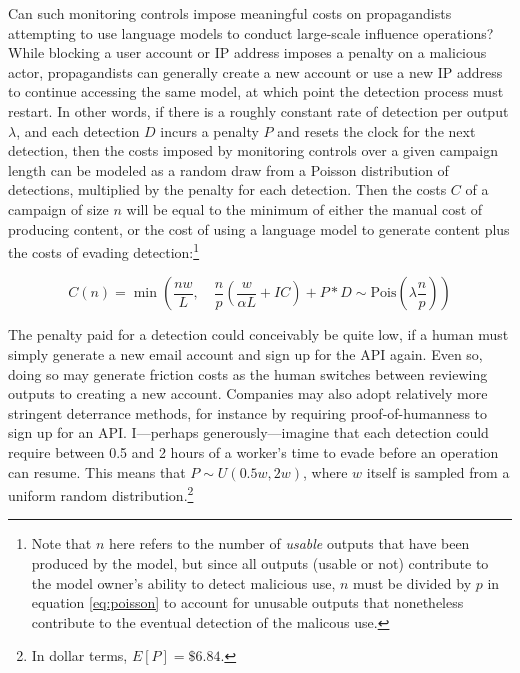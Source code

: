 \documentclass{article}
\begin{document}
Can such monitoring controls impose meaningful costs on propagandists attempting to use language models to conduct large-scale influence operations? While blocking a user account or IP address imposes a penalty on a malicious actor, propagandists can generally create a new account or use a new IP address to continue accessing the same model, at which point the detection process must restart. In other words, if there is a roughly constant rate of detection per output $\lambda$, and each detection $D$ incurs a penalty $P$ and resets the clock for the next detection, then the costs imposed by monitoring controls over a given campaign length can be modeled as a random draw from a Poisson distribution of detections, multiplied by the penalty for each detection. Then the costs $C$ of a campaign of size $n$ will be equal to the minimum of either the manual cost of producing content, or the cost of using a language model to generate content plus the costs of evading detection:\footnote{Note that $n$ here refers to the number of \textit{usable} outputs that have been produced by the model, but since all outputs (usable or not) contribute to the model owner's ability to detect malicious use, $n$ must be divided by $p$ in equation \ref{eq:poisson} to account for unusable outputs that nonetheless contribute to the eventual detection of the malicous use.}

\begin{equation}
  C(n) = \min \left( \frac{nw}{L}, \quad \frac{n}{p} \left( \frac{w}{\alpha L} + IC \right) + P * D \sim \text{Pois}\left( \lambda \frac{n}{p} \right) \right)
  \label{eq:poisson}
\end{equation}

The penalty paid for a detection could conceivably be quite low, if a human must simply generate a new email account and sign up for the API again. Even so, doing so may generate friction costs as the human switches between reviewing outputs to creating a new account. Companies may also adopt relatively more stringent deterrance methods, for instance by requiring proof-of-humanness to sign up for an API. I—perhaps generously—imagine that each detection could require between 0.5 and 2 hours of a worker's time to evade before an operation can resume. This means that $P \sim U(0.5w, 2w)$, where $w$ itself is sampled from a uniform random distribution.\footnote{In dollar terms, $E[P] = \$6.84$.} 
\end{document}
